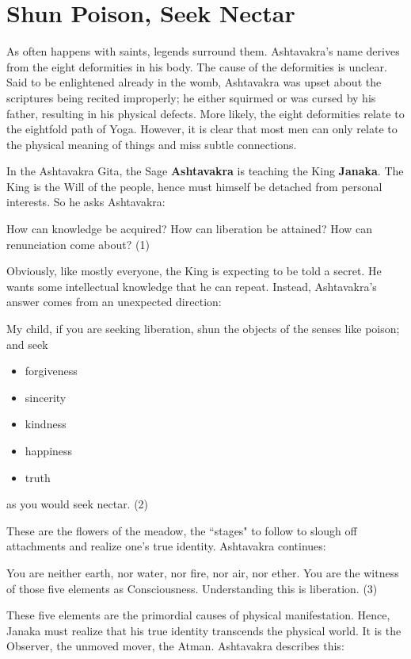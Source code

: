 \section{Shun Poison, Seek Nectar}

As often happens with saints, legends surround them. Ashtavakra's name derives from the eight
deformities in his body. The cause of the deformities is unclear. Said to be enlightened already in the womb,
Ashtavakra was upset about the scriptures being recited improperly; he either squirmed or was cursed by his father,
resulting in his physical defects. More likely, the eight deformities relate to the eightfold path of Yoga. However, it
is clear that most men can only relate to the physical meaning of things and miss subtle connections.

In the Ashtavakra Gita, the Sage \textbf{Ashtavakra} is teaching the King \textbf{Janaka}. The King is the Will of the
people, hence must himself be detached from personal interests. So he asks Ashtavakra:

\begin{quotex}
How can knowledge be acquired? How can liberation be attained? How can renunciation come about? (1) 

\end{quotex}
Obviously, like mostly everyone, the King is expecting to be told a secret. He wants some intellectual knowledge that he
can repeat. Instead, Ashtavakra's answer comes from an unexpected direction:

\begin{quotex}
My child, if you are seeking liberation, shun the objects of the senses like poison; and seek

\begin{itemize}
\item forgiveness 
\item sincerity 
\item kindness
\item happiness 
\item truth 
\end{itemize}
as you would seek nectar. (2) 

\end{quotex}
These are the flowers of the meadow, the ``stages" to follow to slough off attachments and realize
one's true identity. Ashtavakra continues:

\begin{quotex}
You are neither earth, nor water, nor fire, nor air, nor ether. You are the witness of those five elements as
Consciousness. Understanding this is liberation. (3) 

\end{quotex}
These five elements are the primordial causes of physical manifestation. Hence, Janaka must realize that his true
identity transcends the physical world. It is the Observer, the unmoved mover, the Atman. Ashtavakra describes this:

